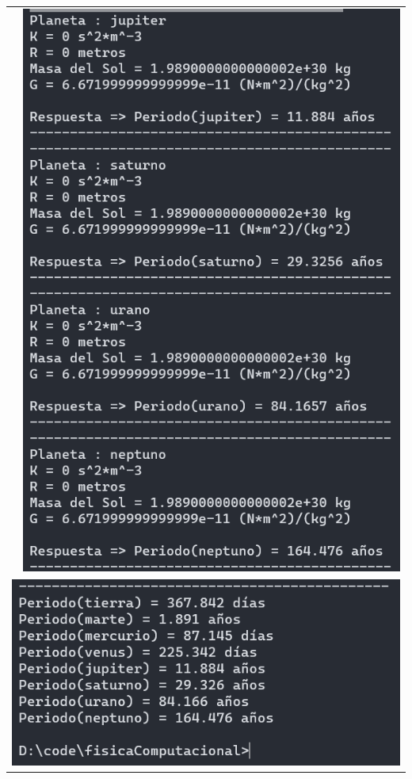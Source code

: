 \documentclass[a4paper,12pt]{article}
\begin{document}
\begin{table}[!htbp]
\begin{tabular}{cc}
\begin{minipage}{.3\textwidth}
            \end{minipage}&\begin{minipage}{.3\textwidth}
                \includegraphics[width=\linewidth]{e4_2}
            \end{minipage}\\
            \multicolumn{2}{c}{
            \begin{minipage}{.3\textwidth}
                \includegraphics[width=\linewidth]{e4_3}
            \end{minipage}
            }
        \end{tabular}
    \end{table}
\end{document}
